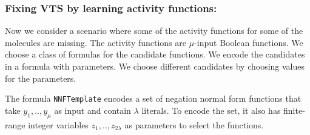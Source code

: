 
    





    


\subsubsection{Fixing VTS by learning activity functions:}

Now we consider a scenario where some of the activity functions for some of the molecules
are missing.
%
The activity functions are $\mu$-input Boolean functions.
%
We choose a class of formulas for the candidate functions.
%
We encode the candidates in a formula with parameters.
%
We choose different candidates by choosing values for the parameters.


The formula \texttt{NNFTemplate} encodes a set of negation normal form functions 
that take $y_1,..,y_\mu$ as input and contain $\lambda$ literals.
To encode the set, it also has finite-range integer variables
$z_1,..,z_{2\lambda}$ as parameters to select the functions.

